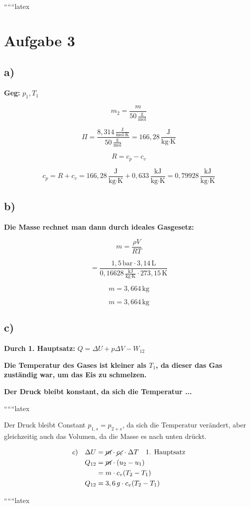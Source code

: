 
``````latex


\section*{Aufgabe 3}

\subsection*{a)}

\textbf{Geg:} $p_1, T_1$

\[
m_2 = \frac{m}{50 \, \frac{\text{g}}{\text{mol}}}
\]

\[
\Pi = \frac{8,314 \, \frac{\text{J}}{\text{mol} \cdot \text{K}}}{50 \, \frac{\text{g}}{\text{mol}}} = 166,28 \, \frac{\text{J}}{\text{kg} \cdot \text{K}}
\]

\[
R = c_p - c_v
\]

\[
c_p = R + c_v = 166,28 \, \frac{\text{J}}{\text{kg} \cdot \text{K}} + 0,633 \, \frac{\text{kJ}}{\text{kg} \cdot \text{K}} = 0,79928 \, \frac{\text{kJ}}{\text{kg} \cdot \text{K}}
\]

\subsection*{b)}

\textbf{Die Masse rechnet man dann durch ideales Gasgesetz:}

\[
m = \frac{\rho V}{R T}
\]

\[
= \frac{1,5 \, \text{bar} \cdot 3,14 \, \text{L}}{0,16628 \, \frac{\text{kJ}}{\text{kg} \cdot \text{K}} \cdot 273,15 \, \text{K}}
\]

\[
m = 3,664 \, \text{kg}
\]

\[
\boxed{m = 3,664 \, \text{kg}}
\]

\subsection*{c)}

\textbf{Durch 1. Hauptsatz:} $Q = \Delta U + p \Delta V - W_{12}$

\textbf{Die Temperatur des Gases ist kleiner als $T_1$, da dieser das Gas zuständig war, um das Eis zu schmelzen.}

\textbf{Der Druck bleibt konstant, da sich die Temperatur ...}

``````latex


Der Druck bleibt Constant \( p_{1,s} = p_{2+s} \), da sich die Temperatur verändert, aber gleichzeitig auch das Volumen, da die Masse es nach unten drückt.

\begin{equation*}
\begin{aligned}
c) \quad \Delta U &= \cancel{m} \cdot \cancel{c_v} \cdot \Delta T \quad \text{1. Hauptsatz} \\
Q_{12} &= \cancel{m} \cdot (u_2 - u_1) \\
&= m \cdot c_v (T_2 - T_1) \\
Q_{12} &= 3,6 \, g \cdot c_v (T_2 - T_1)
\end{aligned}
\end{equation*}

``````latex


